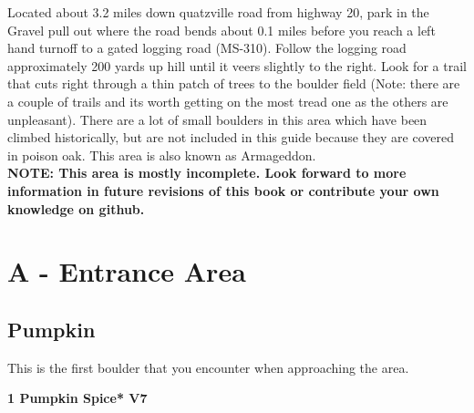 







\raggedcolumns
\begin{multicols}{2}


\end{multicols}
\begin{multicols}{2}
Located about 3.2 miles down quatzville road from highway 20, park in the Gravel pull out where the road bends about 0.1 miles before you reach a left hand turnoff to a gated logging road (MS-310). Follow the logging road approximately 200 yards up hill until it veers slightly to the right. Look for a trail that cuts right through a thin patch of trees to the boulder field (Note: there are a couple of trails and its worth getting on the most tread one as the others are unpleasant). There are a lot of small boulders in this area which have been climbed historically, but are not included in this guide because they are covered in poison oak. This area is also known as Armageddon.\\

\textbf{NOTE: This area is mostly incomplete. Look forward to more information in future revisions of this book or contribute your own knowledge on github.}\\


\newpage


		\section{A - Entrance Area}\label{sa:Entrance Area}
	
	
	
		
		\needspace{1.5cm}
		\subsection*{Pumpkin}\label{bf:Pumpkin}
		This is the first boulder that you encounter when approaching the area.\\
	
		
			
			\needspace{1.5cm}
\label{rt:Pumpkin Spice}
\colorbox{Goldenrod!50}{
\parbox{0.95\linewidth}{
\textbf{
1 Pumpkin Spice* V7  
}}}


\end{multicols}
